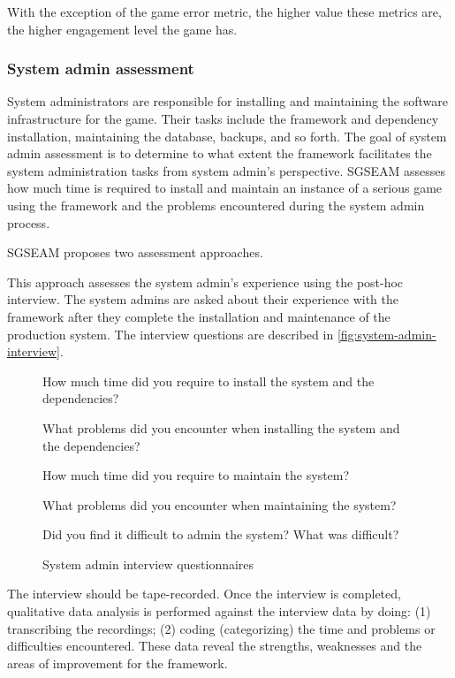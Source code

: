 With the exception of the game error metric, the higher value these metrics are, the higher engagement 
level the game has.

\subsubsection{System admin assessment}

System administrators are responsible for installing and maintaining the software infrastructure
for the game. Their tasks include the framework and dependency installation, maintaining the database, 
backups, and so forth. The goal of system admin assessment is to determine to what extent the 
framework facilitates the system administration tasks from system admin's perspective. SGSEAM 
assesses how much time is required to install and maintain an instance of a serious game using the 
framework and the problems encountered  during the system admin process.
 
SGSEAM proposes two assessment approaches.

\label{Post-hoc system admin interview}

This approach assesses the system admin's experience using the post-hoc interview. The system admins 
are asked about their experience with the framework after they complete the installation and maintenance
 of the production system. The interview questions are described in \autoref{fig:system-admin-interview}.

\begin{figure}[ht!]
\begin{mybox}
\begin{compactenum}
\item How much time did you require to install the system and the dependencies?
\item What problems did you encounter when installing the system and the dependencies?
\item How much time did you require to maintain the system?
\item What problems did you encounter when maintaining the system?
\item Did you find it difficult to admin the system? What was difficult?
\end{compactenum}
\end{mybox}
\caption{System admin interview questionnaires}
\label{fig:system-admin-interview}  
\end{figure}

The interview should be tape-recorded. Once the interview is completed, qualitative data
analysis is performed against the interview data by doing: (1) transcribing the recordings; 
(2) coding (categorizing) the time and problems or difficulties encountered. These data reveal the 
strengths, weaknesses and the areas of improvement for the framework.

